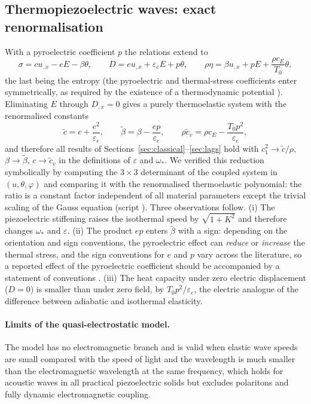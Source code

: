\subsection{Thermopiezoelectric waves: exact renormalisation}
With a pyroelectric coefficient $p$ the relations extend to
\begin{equation}
\sigma=cu_{,x}-eE-\beta\theta,\qquad D=eu_{,x}+\varepsilon_eE+p\theta,\qquad \rho\eta=\beta u_{,x}+pE+\frac{\rho c_E}{T_0}\theta,
\end{equation}
the last being the entropy (the pyroelectric and thermal-stress coefficients enter symmetrically, as required by the existence of a thermodynamic potential \citep{Mindlin1974Thermopiezo,Nowacki1978,Chandrasekharaiah1984}). Eliminating $E$ through $D_{,x}=0$ gives a purely thermoelastic system with the renormalised constants
\begin{equation}
\tilde c=c+\frac{e^2}{\varepsilon_e},\qquad
\tilde\beta=\beta-\frac{ep}{\varepsilon_e},\qquad
\rho\tilde c_v=\rho c_E-\frac{T_0p^2}{\varepsilon_e},\label{eq:renorm}
\end{equation}
and therefore all results of Sections~\ref{sec:classical}--\ref{sec:lags} hold with $c_1^2\to\tilde c/\rho$, $\beta\to\tilde\beta$, $c\to\tilde c_v$ in the definitions of $\varepsilon$ and $\omega_*$. We verified this reduction symbolically by computing the $3\times3$ determinant of the coupled system in $(u,\theta,\varphi)$ and comparing it with the renormalised thermoelastic polynomial: the ratio is a constant factor independent of all material parameters except the trivial scaling of the Gauss equation (script ). Three observations follow. (i) The piezoelectric stiffening raises the isothermal speed by $\sqrt{1+K^2}$ and therefore changes $\omega_*$ and $\varepsilon$. (ii) The product $ep$ enters $\tilde\beta$ with a sign: depending on the orientation and sign conventions, the pyroelectric effect can \emph{reduce} or \emph{increase} the thermal stress, and the sign conventions for $e$ and $p$ vary across the literature, so a reported effect of the pyroelectric coefficient should be accompanied by a statement of conventions \citep{Yang2018}. (iii) The heat capacity under zero electric displacement ($D=0$) is smaller than under zero field, by $T_0p^2/\varepsilon_e$, the electric analogue of the difference between adiabatic and isothermal elasticity.

\paragraph{Limits of the quasi-electrostatic model.} The model has no electromagnetic branch and is valid when elastic wave speeds are small compared with the speed of light and the wavelength is much smaller than the electromagnetic wavelength at the same frequency, which holds for acoustic waves in all practical piezoelectric solids but excludes polaritons and fully dynamic electromagnetic coupling.

